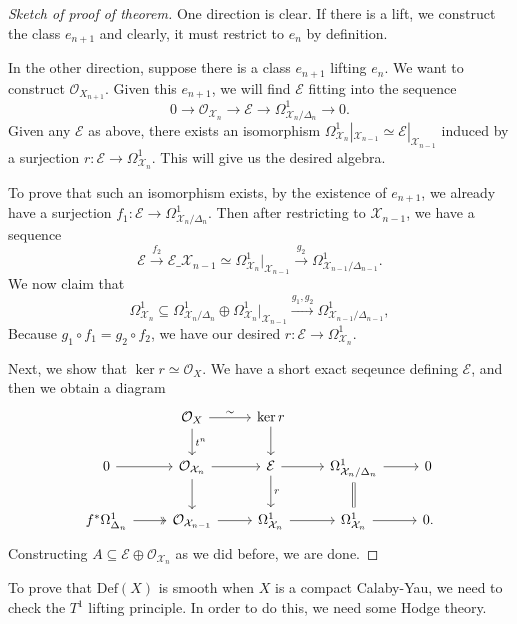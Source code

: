 \documentclass[leqno, openany]{memoir}
\theoremstyle{definition}
\theoremstyle{remark}
\theoremstyle{plain}
\theoremstyle{definition}
\theoremstyle{remark}
\newcommand{\mc}[1]{\mathcal{#1}}
\newcommand{\mr}[1]{\mathrm{#1}}
\begin{document}
\begin{proof}[Sketch of proof of theorem]
    One direction is clear. If there is a lift, we construct the class $e_{n+1}$ and clearly, it must restrict to $e_n$ by definition.

    In the other direction, suppose there is a class $e_{n+1}$ lifting $e_n$. We want to construct $\mc{O}_{X_{n+1}}$. Given this $e_{n+1}$, we will find $\mc{E}$ fitting into the sequence
    \[ 0 \to \mc{O}_{\mc{X}_n} \to \mc{E} \to \Omega^1_{\mc{X}_n / \Delta_n} \to 0. \]
    Given any $\mc{E}$ as above, there exists an isomorphism $\Omega^1_{\mc{X}_n} |_{\mc{X}_{n-1}} \simeq \mc{E} |_{\mc{X}_{n-1}}$ induced by a surjection $r \colon \mc{E} \to \Omega^1_{\mc{X}_n}$. This will give us the desired algebra.

    To prove that such an isomorphism exists, by the existence of $e_{n+1}$, we already have a surjection $f_1 \colon \mc{E} \to \Omega^1_{\mc{X}_n / \Delta_n}$. Then after restricting to $\mc{X}_{n-1}$, we have a sequence
    \[ \mc{E} \xrightarrow{f_2} \mc{E} \_{\mc{X}_{n-1}} \simeq \Omega^1_{\mc{X}_n} |_{\mc{X}_{n-1}} \xrightarrow{g_2} \Omega^1_{\mc{X}_{n-1} / \Delta_{n-1}}. \]
    We now claim that
    \[ \Omega^1_{\mc{X}_n} \subseteq \Omega^1_{\mc{X}_n / \Delta_n} \oplus \Omega^1_{\mc{X}_n} |_{\mc{X}_{n-1}} \xrightarrow{g_1,g_2} \Omega^1_{\mc{X}_{n-1} / \Delta_{n-1}}, \]
    Because $g_1 \circ f_1 = g_2 \circ f_2$, we have our desired $r \colon \mc{E} \to \Omega^1_{\mc{X}_n}$.

    Next, we show that $\ker r \simeq \mc{O}_X$. We have a short exact seqeunce defining $\mc{E}$, and then we obtain a diagram
    \begin{equation*}
    \begin{tikzcd}
        & \mc{O}_X \ar{r}{\sim} \ar{d}{t^n} & \ker r \ar{d} \\
        0 \ar{r} & \mc{O}_{\mc{X}_n} \ar{r} \ar{d} & \mc{E} \ar{r} \ar{d}{r} & \Omega^1_{\mc{X}_n/\Delta_n} \ar{r} \ar[equal]{d} & 0 \\
        f^* \Omega^1_{\Delta_n} \ar[twoheadrightarrow]{r} & \mc{O}_{\mc{X}_{n-1}} \ar{r} & \Omega^1_{\mc{X}_n} \ar{r} & \Omega^1_{\mc{X}_n} \ar{r} & 0.
    \end{tikzcd}
    \end{equation*}
    Constructing $A \subseteq \mc{E} \oplus \mc{O}_{\mc{X}_n}$ as we did before, we are done.
\end{proof}

To prove that $\mr{Def}(X)$ is smooth when $X$ is a compact Calaby-Yau, we need to check the $T^1$ lifting principle. In order to do this, we need some Hodge theory.
\end{document}
